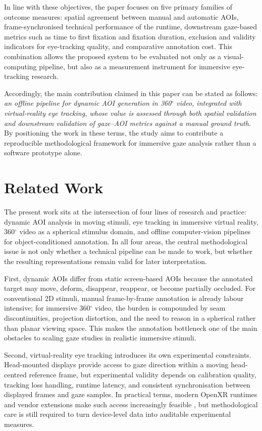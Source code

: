 \documentclass[11pt]{article}
\begin{document}
In line with these objectives, the paper focuses on five primary families of outcome measures: spatial agreement between manual and automatic AOIs, frame-synchronised technical performance of the runtime, downstream gaze-based metrics such as time to first fixation and fixation duration, exclusion and validity indicators for eye-tracking quality, and comparative annotation cost. This combination allows the proposed system to be evaluated not only as a visual-computing pipeline, but also as a measurement instrument for immersive eye-tracking research.

Accordingly, the main contribution claimed in this paper can be stated as follows: \emph{an offline pipeline for dynamic AOI generation in 360$^{\circ}$ video, integrated with virtual-reality eye tracking, whose value is assessed through both spatial validation and downstream validation of gaze--AOI metrics against a manual ground truth}. By positioning the work in these terms, the study aims to contribute a reproducible methodological framework for immersive gaze analysis rather than a software prototype alone.

\section{Related Work}

The present work sits at the intersection of four lines of research and practice: dynamic AOI analysis in moving stimuli, eye tracking in immersive virtual reality, 360$^{\circ}$ video as a spherical stimulus domain, and offline computer-vision pipelines for object-conditioned annotation. In all four areas, the central methodological issue is not only whether a technical pipeline can be made to work, but whether the resulting representations remain valid for later interpretation.

First, dynamic AOIs differ from static screen-based AOIs because the annotated target may move, deform, disappear, reappear, or become partially occluded. For conventional 2D stimuli, manual frame-by-frame annotation is already labour intensive; for immersive 360$^{\circ}$ video, the burden is compounded by seam discontinuities, projection distortion, and the need to reason in a spherical rather than planar viewing space. This makes the annotation bottleneck one of the main obstacles to scaling gaze studies in realistic immersive stimuli.

Second, virtual-reality eye tracking introduces its own experimental constraints. Head-mounted displays provide access to gaze direction within a moving head-centred reference frame, but experimental validity depends on calibration quality, tracking loss handling, runtime latency, and consistent synchronisation between displayed frames and gaze samples. In practical terms, modern OpenXR runtimes and vendor extensions make such access increasingly feasible \cite{openxr_eye_gaze_ext,vive_openxr_overview,vive_eye_gaze,vive_eye_tracker}, but methodological care is still required to turn device-level data into auditable experimental measures.
\end{document}

